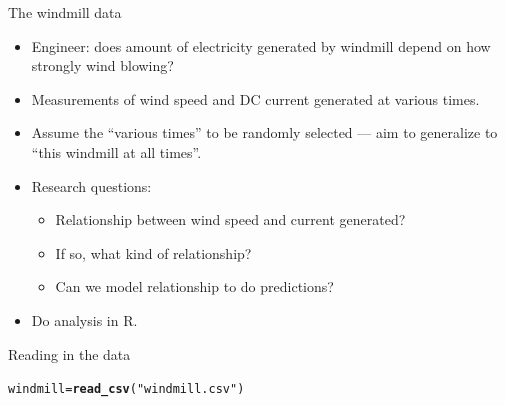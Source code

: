 \documentclass[unknownkeysallowed]{beamer}\usepackage[]{graphicx}\usepackage[]{color}
\makeatletter
\newcommand{\hlstr}[1]{\textcolor[rgb]{0.192,0.494,0.8}{#1}}%
\newcommand{\hlstd}[1]{\textcolor[rgb]{0.345,0.345,0.345}{#1}}%
\newcommand{\hlkwb}[1]{\textcolor[rgb]{0.69,0.353,0.396}{#1}}%
\newcommand{\hlkwd}[1]{\textcolor[rgb]{0.737,0.353,0.396}{\textbf{#1}}}%
\newenvironment{kframe}{%
 \def\at@end@of@kframe{}%
 \ifinner\ifhmode%
  \def\at@end@of@kframe{\end{minipage}}%
  \begin{minipage}{\columnwidth}%
 \fi\fi%
 \def\FrameCommand##1{\hskip\@totalleftmargin \hskip-\fboxsep
 \colorbox{shadecolor}{##1}\hskip-\fboxsep
     \hskip-\linewidth \hskip-\@totalleftmargin \hskip\columnwidth}%
 \MakeFramed {\advance\hsize-\width
   \@totalleftmargin\z@ \linewidth\hsize
   \@setminipage}}%
 {\par\unskip\endMakeFramed%
 \at@end@of@kframe}
\newenvironment{knitrout}{}{} %
\makeatother
\begin{document}
\begin{frame}[fragile]{The windmill data}

  \begin{itemize}
  \item Engineer: does amount of electricity generated by windmill
    depend on how strongly wind blowing?
  \item Measurements of wind speed and DC current generated at various times.
  \item Assume the ``various times'' to be randomly selected --- aim
    to generalize to ``this windmill at all times''.
  \item Research questions:
    \begin{itemize}
    \item Relationship between wind speed and current generated?
    \item If so, what kind of relationship?
    \item Can we model relationship to do predictions?
    \end{itemize}
  \item Do analysis in R.
  \end{itemize}

\end{frame}

\begin{frame}[fragile]{Reading in the data}

\begin{knitrout}
\color{fgcolor}\begin{kframe}
\begin{alltt}
\hlstd{windmill}\hlkwb{=}\hlkwd{read_csv}\hlstd{(}\hlstr{"windmill.csv"}\hlstd{)}
\end{alltt}


{\ttfamily\noindent\itshape\color{messagecolor}{\#\# Parsed with column specification:\\\#\# cols(\\\#\#\ \  wind\_velocity = col\_double(),\\\#\#\ \  DC\_output = col\_double()\\\#\# )}}\end{kframe}
\end{knitrout}

\end{frame}
\end{document}
